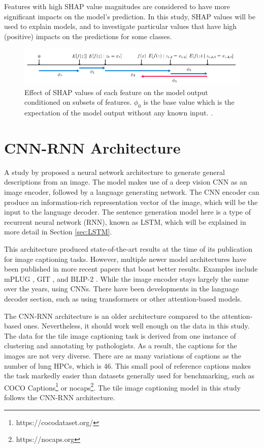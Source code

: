 \documentclass{l4proj}
\begin{document}
Features with high SHAP value magnitudes are considered to have more significant impacts on the model's prediction. In this study, SHAP values will be used to explain models, and to investigate particular values that have high (positive) impacts on the predictions for some classes.

\begin{figure}
    \centering
    \includegraphics[width=1\linewidth]{images/shap.png}
    \caption{Effect of SHAP values of each feature on the model output conditioned on subsets of features. $\phi_0$ is the base value which is the expectation of the model output without any known input. \citep{lundberg2017}.}
    \label{fig:shap}
\end{figure}

\section{CNN-RNN Architecture}
A study by \cite{Vinyals2015} proposed a neural network architecture to generate general descriptions from an image. The model makes use of a deep vision CNN as an image encoder, followed by a language generating network. The CNN encoder can produce an information-rich representation vector of the image, which will be the input to the language decoder. The sentence generation model here is a type of recurrent neural network (RNN), known as LSTM, which will be explained in more detail in Section \ref{sec:LSTM}.

This architecture produced state-of-the-art results at the time of its publication for image captioning tasks. However, multiple newer model architectures have been published in more recent papers that boast better results. Examples include mPLUG \citep{mplug}, GIT \citep{GIT}, and BLIP-2 \citep{blip2}. While the image encoder stays largely the same over the years, using CNNs. There have been developments in the language decoder section, such as using transformers or other attention-based models. 

The CNN-RNN architecture is an older architecture compared to the attention-based ones. Nevertheless, it should work well enough on the data in this study. The data for the tile image captioning task is derived from one instance of clustering and annotating by pathologists. As a result, the captions for the images are not very diverse. There are as many variations of captions as the number of lung HPCs, which is 46. This small pool of reference captions makes the task markedly easier than datasets generally used for benchmarking, such as COCO Captions\footnote{https://cocodataset.org/} or nocaps\footnote{https://nocaps.org}. The tile image captioning model in this study follows the CNN-RNN architecture.
\end{document}
